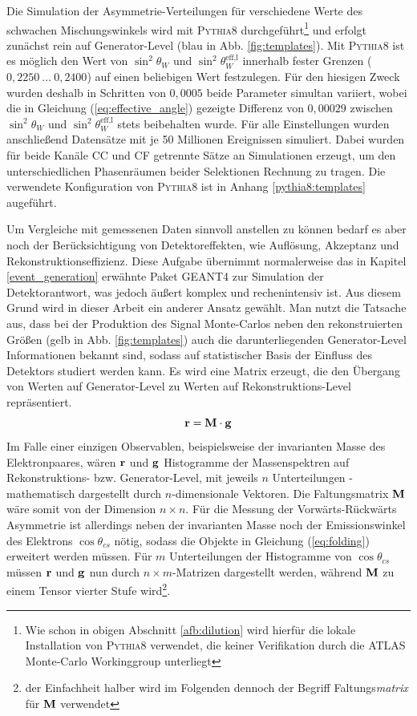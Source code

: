 Die Simulation der Asymmetrie-Verteilungen für verschiedene Werte des schwachen
Mischungswinkels wird mit \textsc{Pythia8} durchgeführt\footnote{Wie schon in
obigen Abschnitt \ref{afb:dilution} wird hierfür die lokale Installation von
\textsc{Pythia8} verwendet, die keiner Verifikation durch die ATLAS Monte-Carlo
Workinggroup unterliegt} und erfolgt zunächst rein auf Generator-Level (blau in
Abb. \ref{fig:templates}). Mit \textsc{Pythia8} ist es möglich den Wert von
$\sin^2\theta_W$ und $\sin^2\theta_W^\text{eff,l}$ innerhalb fester Grenzen
($0,2250 \: ... \: 0,2400$) auf einen beliebigen Wert festzulegen. Für den
hiesigen Zweck wurden deshalb in Schritten von $0,0005$ beide Parameter
simultan variiert, wobei die in Gleichung (\ref{eq:effective_angle}) gezeigte
Differenz von $0,00029$ zwischen $\sin^2\theta_W$ und
$\sin^2\theta_W^\text{eff,l}$ stets beibehalten wurde. Für alle Einstellungen
wurden anschließend Datensätze mit je 50 Millionen Ereignissen simuliert. Dabei
wurden für beide Kanäle \ac{CC} und \ac{CF} getrennte Sätze an Simulationen
erzeugt, um den unterschiedlichen Phasenräumen beider Selektionen Rechnung zu
tragen. Die verwendete Konfiguration von \textsc{Pythia8} ist in Anhang
\ref{pythia8:templates} augeführt.

Um Vergleiche mit gemessenen Daten sinnvoll anstellen zu können bedarf es
aber noch der Berücksichtigung von Detektoreffekten, wie Auflösung, Akzeptanz
und Rekonstruktionseffizienz. Diese Aufgabe übernimmt normalerweise das in
Kapitel \ref{event_generation} erwähnte Paket \textsc{GEANT4} zur Simulation
der Detektorantwort, was jedoch äußert komplex und rechenintensiv ist. Aus
diesem Grund wird in dieser Arbeit ein anderer Ansatz gewählt. Man nutzt die
Tatsache aus, dass bei der Produktion des Signal Monte-Carlos neben den
rekonstruierten Größen (gelb in Abb. \ref{fig:templates}) auch die
darunterliegenden Generator-Level Informationen bekannt sind, sodass auf
statistischer Basis der Einfluss des Detektors studiert werden kann. Es wird
eine Matrix erzeugt, die den Übergang von Werten auf Generator-Level zu Werten
auf Rekonstruktions-Level repräsentiert.
\begin{equation}
    \bf r = M \cdot \bf{g}
    \label{eq:folding}
\end{equation}
Im Falle einer einzigen Observablen, beispielsweise der invarianten Masse des
Elektronpaares, wären $\bf{r}$ und $\bf{g}$ Histogramme der Massenspektren auf
Rekonstruktions- bzw. Generator-Level, mit jeweils $n$ Unterteilungen -
mathematisch dargestellt durch $n$-dimensionale Vektoren. Die Faltungsmatrix
$\bf{M}$ wäre somit von der Dimension $n \times n$. Für die Messung der
Vorwärts-Rückwärts Asymmetrie ist allerdings neben der invarianten Masse noch
der Emissionswinkel des Elektrons $\cos\theta_{cs}$ nötig, sodass die Objekte
in Gleichung (\ref{eq:folding}) erweitert werden müssen. Für $m$ Unterteilungen
der Histogramme von $\cos\theta_{cs}$ müssen $\bf{r}$ und $\bf{g}$ nun durch 
$n \times m$-Matrizen dargestellt werden, während $\bf{M}$ zu einem Tensor
vierter Stufe wird\footnote{der Einfachheit halber wird im Folgenden dennoch
der Begriff Faltungs\textit{matrix} für $\bf{M}$ verwendet}.

